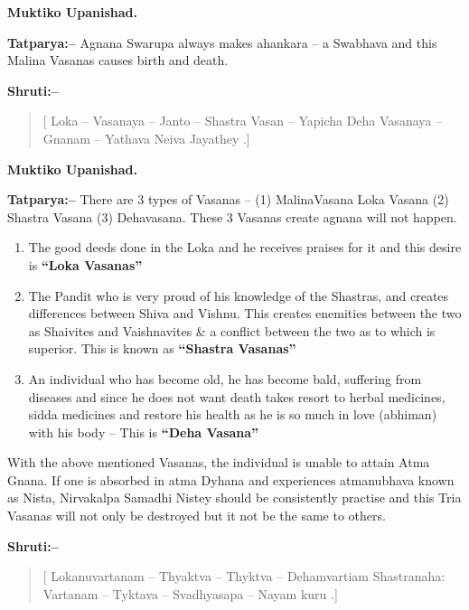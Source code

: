 \begin{flushright}
\textbf{Muktiko Upanishad.}
\end{flushright}

\textbf{Tatparya:–} Agnana Swarupa always makes ahankara – a Swabhava and this Malina Vasanas causes birth and death.

\textbf{Shruti:–}

\begin{verse}
[ Loka – Vasanaya – Janto – Shastra Vasan – Yapicha  Deha Vasanaya – Gnanam – Yathava  Neiva Jayathey .]
\end{verse}

\begin{flushright}
\textbf{Muktiko Upanishad.}
\end{flushright}

\textbf{Tatparya:–} There are 3 types of Vasanas – (1) MalinaVasana Loka Vasana (2) Shastra Vasana (3) Dehavasana. These 3 Vasanas create agnana will not happen.

\begin{enumerate}
\item The good deeds done in the Loka and he receives praises for it and this desire is \textbf{“Loka Vasanas”}

 \item The Pandit who is very proud of his knowledge of the Shastras, and creates differences between Shiva and Vishnu. This creates enemities between the two as Shaivites and Vaishnavites \& a conflict between the two as to which is superior. This is known as \textbf{“Shastra Vasanas”}

 \item An individual who has become old, he has become bald, suffering from diseases and since he does not want death takes resort to herbal medicines, sidda medicines and restore his health as he is so much in love (abhiman) with his body – This is \textbf{“Deha Vasana”}

\end{enumerate}

With the above mentioned Vasanas, the individual is unable to attain Atma Gnana. If one is absorbed in atma Dyhana and experiences atmanubhava known as Nista, Nirvakalpa Samadhi Nistey should be consistently practise and this Tria Vasanas will not only be destroyed but it not be the same to others.

\textbf{Shruti:–}

\begin{verse}
[ Lokanuvartanam – Thyaktva – Thyktva – Dehamvartiam  Shastranaha: Vartanam – Tyktava – Svadhyasapa – Nayam kuru .]
\end{verse}

